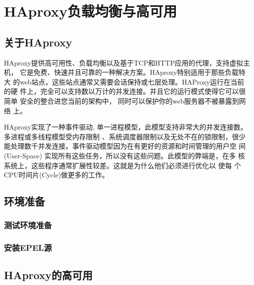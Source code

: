 \chapter{HAproxy负载均衡与高可用}
\label{chap:haproxyCluster}

\section{关于HAproxy}
\label{sec:aboutHaproxy}

HAproxy提供高可用性、负载均衡以及基于TCP和HTTP应用的代理，支持虚拟主机，
它是免费、快速并且可靠的一种解决方案。HAproxy特别适用于那些负载特大
的web站点，这些站点通常又需要会话保持或七层处理。HAProxy运行在当前的硬
件上，完全可以支持数以万计的并发连接。并且它的运行模式使得它可以很简单
安全的整合进您当前的架构中， 同时可以保护你的web服务器不被暴露到网络
上。

HAproxy实现了一种事件驱动, 单一进程模型，此模型支持非常大的并发连接数。
多进程或多线程模型受内存限制 、系统调度器限制以及无处不在的锁限制，很少
能处理数千并发连接。事件驱动模型因为在有更好的资源和时间管理的用户空
间(User-Space) 实现所有这些任务，所以没有这些问题。此模型的弊端是，在多
核系统上，这些程序通常扩展性较差。这就是为什么他们必须进行优化以 使每
个CPU时间片(Cycle)做更多的工作。\cite{baike}

\section{环境准备}
\label{sec:envPrepareHaproxy}

\subsection{测试环境准备}

\subsection{安装EPEL源}

\section{HAproxy的高可用}
\label{sec:HighAvailableHaproxy}

